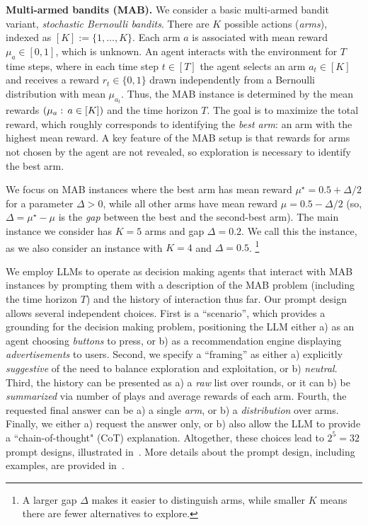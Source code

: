 \noindent\textbf{Multi-armed bandits (MAB).} We consider a basic multi-armed bandit variant, \emph{stochastic Bernoulli bandits}. There are $K$ possible actions (\emph{arms}), indexed as $[K]:=\{1,\ldots,K\}$. Each arm $a$ is associated with mean reward $\mu_a\in[0,1]$, which is unknown.
An agent interacts with the environment for $T$ time steps, where in each time step $t\in [T]$ the agent selects an arm $a_t \in [K]$ and receives a reward $r_t\in\{0,1\}$ drawn independently from a Bernoulli distribution with mean $\mu_{a_t}$. Thus, the MAB instance is determined by the mean rewards $\left(\mu_a:\,a\in[K]\right)$ and the time horizon $T$. The goal is to maximize the total reward, which roughly corresponds to identifying the \emph{best arm}: an arm with the highest mean reward.
A key feature of the MAB setup is that rewards for arms not chosen by the agent are not revealed, so exploration is necessary to identify the best arm.


We focus on MAB instances where the best arm has mean reward $\mu^\star = 0.5+\Delta/2$ for a parameter $\Delta>0$, while all other arms have mean reward $\mu = 0.5-\Delta/2$ (so, $\Delta = \mu^\star-\mu$ is the \emph{gap} between the best and the second-best arm).
The main instance we consider has $K=5$ arms and gap $\Delta=0.2$. We call this the \hard instance, as we also consider an \easy instance with $K=4$ and $\Delta=0.5$.%
\footnote{A larger gap $\Delta$ makes it easier to distinguish arms, while smaller $K$ means there are fewer alternatives to explore.}


We employ LLMs to operate as decision making agents that interact with MAB instances by prompting them
with a description of the MAB problem (including the time horizon $T$) and the history of interaction thus far. Our prompt design allows several independent choices.
First is a ``scenario'', which provides a grounding for the decision making problem, positioning the LLM either a) as an agent choosing \emph{buttons} to press, or b) as a recommendation engine displaying \emph{advertisements} to users.
Second, we specify a ``framing'' as either a) explicitly \emph{suggestive} of the need to balance exploration and exploitation, or b) \emph{neutral}.
Third, the history can be presented as a) a \emph{raw} list over rounds, or it can b) be \emph{summarized} via number of plays and average rewards of each arm.
Fourth, the requested final answer can be a) a single \emph{arm}, or b) a \emph{distribution} over arms. 
Finally, we either a) request the answer only, or b) also allow the LLM to provide a ``chain-of-thought" (CoT) explanation.
Altogether, these choices lead to $2^5=32$ prompt designs, illustrated in~.
More details about the prompt design, including examples, are provided in~.


